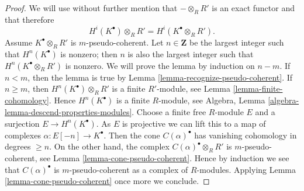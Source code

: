 \documentclass[10pt,a4paper]{amsart}
\theoremstyle{plain}
\theoremstyle{definition}
\theoremstyle{remark}
\numberwithin{equation}{subsection}
\begin{document}
\begin{proof}
We will use without further mention that $- \otimes_R R'$ is
an exact functor and that therefore
$$
H^i(K^\bullet) \otimes_R R' = H^i(K^\bullet \otimes_R R').
$$
Assume $K^\bullet \otimes_R R'$ is $m$-pseudo-coherent.
Let $n \in \mathbf{Z}$ be the largest integer such that
$H^n(K^\bullet)$ is nonzero; then $n$ is also the largest integer
such that $H^n(K^\bullet \otimes_R R')$ is nonzero.
We will prove the lemma by induction on $n - m$.
If $n < m$, then the lemma is true by
Lemma \ref{lemma-recognize-pseudo-coherent}.
If $n \geq m$, then $H^n(K^\bullet) \otimes_R R'$ is a finite
$R'$-module, see
Lemma \ref{lemma-finite-cohomology}.
Hence $H^n(K^\bullet)$ is a finite $R$-module, see
Algebra, Lemma \ref{algebra-lemma-descend-properties-modules}.
Choose a finite free $R$-module $E$ and a surjection $E \to H^n(K^\bullet)$.
As $E$ is projective we can lift this to a map of complexes
$\alpha : E[-n] \to K^\bullet$. Then the cone $C(\alpha)^\bullet$ has
vanishing cohomology in degrees $\geq n$. On the other hand, the
complex $C(\alpha)^\bullet \otimes_R R'$ is $m$-pseudo-coherent, see
Lemma \ref{lemma-cone-pseudo-coherent}.
Hence by induction we see that $C(\alpha)^\bullet$ is $m$-pseudo-coherent
as a complex of $R$-modules. Applying
Lemma \ref{lemma-cone-pseudo-coherent}
once more we conclude.
\end{proof}
\end{document}
